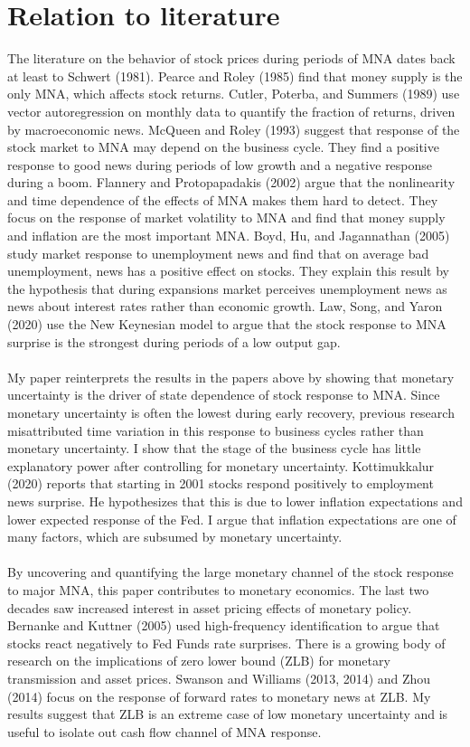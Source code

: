 \documentclass[12pt]{article}
\begin{document}
\section{Relation to literature} 

The literature on the behavior of stock prices during periods of MNA dates back at least to Schwert (1981). Pearce and Roley (1985) find that money supply is the only MNA, which affects stock returns. Cutler, Poterba, and Summers (1989) use vector autoregression on monthly data to quantify the fraction of returns, driven by macroeconomic news. McQueen and Roley (1993) suggest that response of the stock market to MNA may depend on the business cycle. They find a positive response to good news during periods of low growth and a negative response during a boom. Flannery and Protopapadakis (2002) argue that the nonlinearity and time dependence of the effects of MNA makes them hard to detect. They focus on the response of market volatility to MNA and find that money supply and inflation are the most important MNA. Boyd, Hu, and Jagannathan (2005) study market response to unemployment news and find that on average bad unemployment, news has a positive effect on stocks. They explain this result by the hypothesis that during expansions market perceives unemployment news as news about interest rates rather than economic growth. Law, Song, and Yaron (2020) use the New Keynesian model to argue that the stock response to MNA surprise is the strongest during periods of a low output gap. 
\paragraph{}
My paper reinterprets the results in the papers above by showing that monetary uncertainty is the driver of state dependence of stock response to MNA. Since monetary uncertainty is often the lowest during early recovery, previous research misattributed time variation in this response to business cycles rather than monetary uncertainty. I show that the stage of the business cycle has little explanatory power after controlling for monetary uncertainty. Kottimukkalur (2020) reports that starting in 2001 stocks respond  positively to employment news surprise. He hypothesizes that this is due to lower inflation expectations and lower expected response of the Fed. I argue that inflation expectations are one of many factors, which are subsumed by monetary uncertainty.
\paragraph{}
By uncovering and quantifying the large monetary channel of the stock response to major MNA, this paper contributes to monetary economics. The last two decades saw increased interest in asset pricing effects of monetary policy. Bernanke and Kuttner (2005) used high-frequency identification to argue that stocks react negatively to Fed Funds rate surprises. There is a growing body of research on the implications of zero lower bound (ZLB) for monetary transmission and asset prices. Swanson and Williams (2013, 2014) and Zhou (2014) focus on the response of forward rates to monetary news at ZLB. My results suggest that ZLB is an extreme case of low monetary uncertainty and is useful to isolate out cash flow channel of MNA response.
\end{document}
